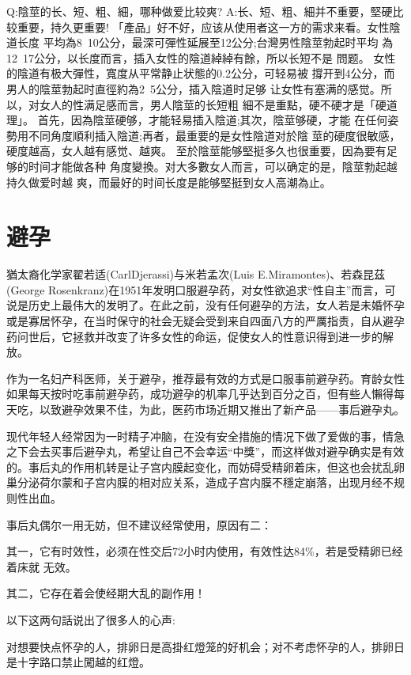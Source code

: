 \documentclass[12pt,UTF8]{ctexbook}
\begin{document}
Q:陰莖的长、短、粗、細，哪种做爱比较爽?
A:长、短、粗、細并不重要，堅硬比较重要，持久更重要!
「產品」好不好，应该从使用者这一方的需求来看。女性陰道长度
平均為8~10公分，最深可彈性延展至12公分;台灣男性陰莖勃起时平均
為12~17公分，以长度而言，插入女性的陰道綽綽有餘，所以长短不是
問题。
女性的陰道有极大彈性，寬度从平常静止状態的0.2公分，可轻易被
撐开到4公分，而男人的陰莖勃起时直徑約為2~5公分，插入陰道时足够
让女性有塞满的感觉。所以，对女人的性满足感而言，男人陰莖的长短粗
細不是重點，硬不硬才是「硬道理」。
首先，因為陰莖硬够，才能轻易插入陰道;其次，陰莖够硬，才能
在任何姿勢用不同角度順利插入陰道;再者，最重要的是女性陰道对於陰
莖的硬度很敏感，硬度越高，女人越有感觉、越爽。
至於陰莖能够堅挺多久也很重要，因為要有足够的时间才能做各种
角度變換。对大多數女人而言，可以确定的是，陰莖勃起越持久做爱时越
爽，而最好的时间长度是能够堅挺到女人高潮為止。



\chapter{避孕}

猶太裔化学家翟若适(CarlDjerassi)与米若孟次(Luis E.Miramontes)、若森昆茲(George Rosenkranz)在1951年发明口服避孕药，对女性欲追求“性自主”而言，可说是历史上最伟大的发明了。在此之前，没有任何避孕的方法，女人若是未婚怀孕或是寡居怀孕，在当时保守的社会无疑会受到来自四面八方的严厲指责，自从避孕药问世后，它拯救并改变了许多女性的命运，促使女人的性意识得到进一步的解放。

作为一名妇产科医师，关于避孕，推荐最有效的方式是口服事前避孕药。育龄女性如果每天按时吃事前避孕药，成功避孕的机率几乎达到百分之百，但有些人懶得每天吃，以致避孕效果不佳，为此，医药市场近期又推出了新产品——事后避孕丸。

现代年轻人经常因为一时精子冲脑，在没有安全措施的情况下做了爱做的事，情急之下会去买事后避孕丸，希望让自己不会幸运“中獎”，而这样做对避孕确实是有效的。事后丸的作用机转是让子宫内膜起变化，而妨碍受精卵着床，但这也会扰乱卵巢分泌荷尔蒙和子宫内膜的相对应关系，造成子宫内膜不穩定崩落，出现月经不规则性出血。

事后丸偶尔一用无妨，但不建议经常使用，原因有二：

其一，它有时效性，必须在性交后72小时内使用，有效性达84\%，若是受精卵已经着床就
无效。

其二，它存在着会使经期大乱的副作用！

以下这两句話说出了很多人的心声:

对想要快点怀孕的人，排卵日是高掛红燈笼的好机会；对不考虑怀孕的人，排卵日是十字路口禁止闖越的红燈。
\end{document}
